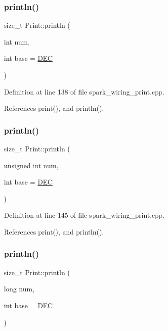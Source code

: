 \subsubsection{\texorpdfstring{println()}{println()}\hspace{0.1cm}{\footnotesize\ttfamily [4/21]}}
{\footnotesize\ttfamily size\+\_\+t Print\+::println (\begin{DoxyParamCaption}\item[{int}]{num,  }\item[{int}]{base = {\ttfamily \hyperlink{docs_2src_2spark__wiring__print_8h_a26e216c38cffa0a9965fa7933ba558b1}{D\+EC}} }\end{DoxyParamCaption})}



Definition at line 138 of file spark\+\_\+wiring\+\_\+print.\+cpp.



References print(), and println().

\mbox{\label{class_print_ac87eed1fcb78641169ba2244278c899e}} 
\subsubsection{\texorpdfstring{println()}{println()}\hspace{0.1cm}{\footnotesize\ttfamily [5/21]}}
{\footnotesize\ttfamily size\+\_\+t Print\+::println (\begin{DoxyParamCaption}\item[{unsigned int}]{num,  }\item[{int}]{base = {\ttfamily \hyperlink{docs_2src_2spark__wiring__print_8h_a26e216c38cffa0a9965fa7933ba558b1}{D\+EC}} }\end{DoxyParamCaption})}



Definition at line 145 of file spark\+\_\+wiring\+\_\+print.\+cpp.



References print(), and println().

\mbox{\label{class_print_a833fbec3ceba92e3ec95f51e026e4569}} 
\subsubsection{\texorpdfstring{println()}{println()}\hspace{0.1cm}{\footnotesize\ttfamily [6/21]}}
{\footnotesize\ttfamily size\+\_\+t Print\+::println (\begin{DoxyParamCaption}\item[{long}]{num,  }\item[{int}]{base = {\ttfamily \hyperlink{docs_2src_2spark__wiring__print_8h_a26e216c38cffa0a9965fa7933ba558b1}{D\+EC}} }\end{DoxyParamCaption})}



